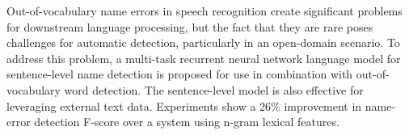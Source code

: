 Out-of-vocabulary name errors in speech recognition create significant problems for downstream language processing, but the fact that they are rare poses challenges for automatic detection, particularly in an open-domain scenario. To address this problem, a multi-task recurrent neural network language model for sentence-level name detection is proposed for use in combination with out-of-vocabulary word detection. The sentence-level model is also effective for leveraging external text data. Experiments show a 26\% improvement in name-error detection F-score over a system using n-gram lexical features.

